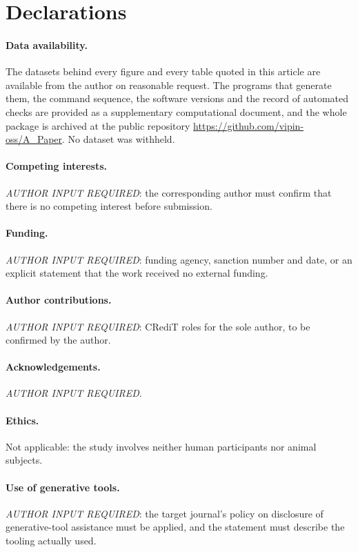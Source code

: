 \documentclass[10pt,a4paper]{article}
\begin{document}








\section*{Declarations}

\paragraph{Data availability.}
The datasets behind every figure and every table quoted in this article are
available from the author on reasonable request.  The programs that generate
them, the command sequence, the software versions and the record of automated
checks are provided as a supplementary computational document, and the whole
package is archived at the public repository
\url{https://github.com/vipin-oss/A_Paper}.  No dataset was withheld.

\paragraph{Competing interests.}
\textit{AUTHOR INPUT REQUIRED}: the corresponding author must confirm that there
is no competing interest before submission.

\paragraph{Funding.}
\textit{AUTHOR INPUT REQUIRED}: funding agency, sanction number and date, or an
explicit statement that the work received no external funding.

\paragraph{Author contributions.}
\textit{AUTHOR INPUT REQUIRED}: CRediT roles for the sole author, to be confirmed
by the author.

\paragraph{Acknowledgements.}
\textit{AUTHOR INPUT REQUIRED}.

\paragraph{Ethics.}
Not applicable: the study involves neither human participants nor animal
subjects.

\paragraph{Use of generative tools.}
\textit{AUTHOR INPUT REQUIRED}: the target journal's policy on disclosure of
generative-tool assistance must be applied, and the statement must describe the
tooling actually used.

\appendix





\end{document}
